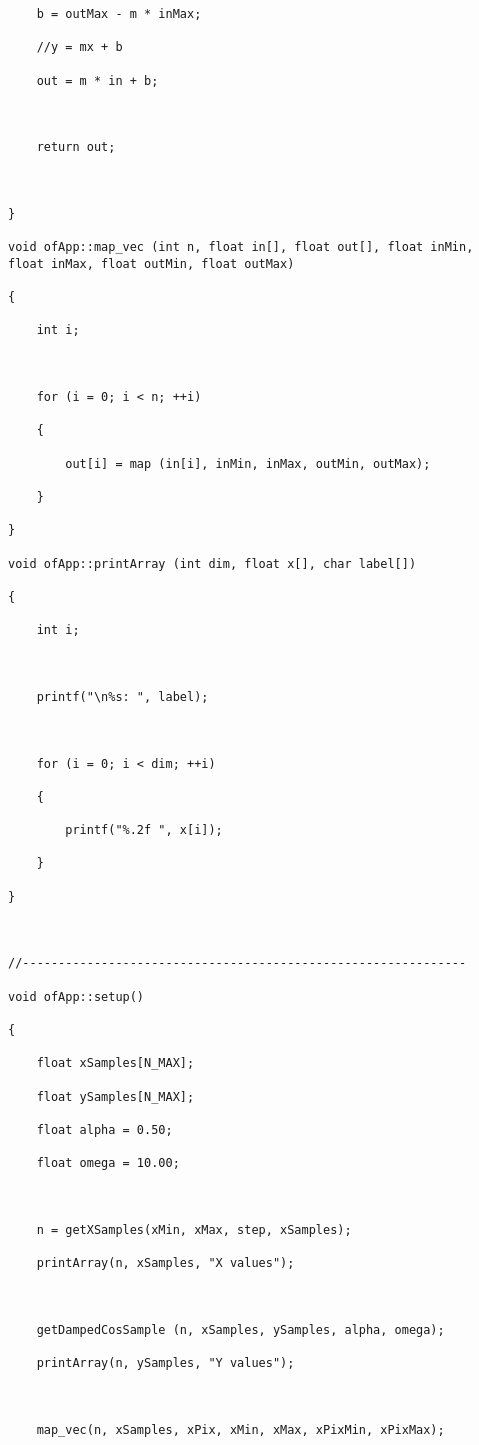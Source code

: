 \documentclass[letterpaper, 24pt, final, onecolumn, titlepage] {article}
\begin{document}
\begin{lstlisting}
    b = outMax - m * inMax;

    //y = mx + b

    out = m * in + b;



    return out;



}

void ofApp::map_vec (int n, float in[], float out[], float inMin, float inMax, float outMin, float outMax)

{

    int i;



    for (i = 0; i < n; ++i)

    {

        out[i] = map (in[i], inMin, inMax, outMin, outMax);

    }

}

void ofApp::printArray (int dim, float x[], char label[])

{

    int i;



    printf("\n%s: ", label);



    for (i = 0; i < dim; ++i)

    {

        printf("%.2f ", x[i]);

    }

}



//--------------------------------------------------------------

void ofApp::setup()

{

    float xSamples[N_MAX];

    float ySamples[N_MAX];

    float alpha = 0.50;

    float omega = 10.00;



    n = getXSamples(xMin, xMax, step, xSamples);

    printArray(n, xSamples, "X values");



    getDampedCosSample (n, xSamples, ySamples, alpha, omega);

    printArray(n, ySamples, "Y values");



    map_vec(n, xSamples, xPix, xMin, xMax, xPixMin, xPixMax);


\end{lstlisting}
\end{document}
